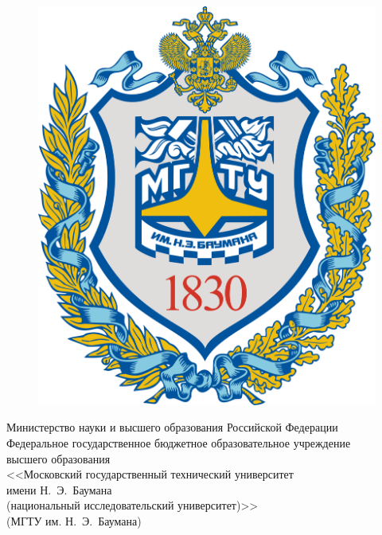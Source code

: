 \begin{titlepage}
	
	\centering
	
	\begin{figure}
		\vspace{3.4mm}
		\hspace{-8mm}
		\includegraphics[width=1\linewidth]{images/bmstu_logo.png}
	\end{figure}
	
	{
		\singlespacing \small {}\selectfont
		Министерство науки и высшего образования Российской Федерации \\
		Федеральное государственное бюджетное образовательное учреждение \\
		высшего образования \\
		<<Московский государственный технический университет \\
		имени Н.~Э.~Баумана \\
		(национальный исследовательский университет)>> \\
		(МГТУ им. Н.~Э.~Баумана) \\
	}
	

\end{titlepage}
